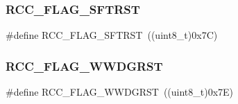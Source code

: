 \subsubsection{\texorpdfstring{RCC\_FLAG\_SFTRST}{RCC\_FLAG\_SFTRST}}
{\footnotesize\ttfamily \#define R\+C\+C\+\_\+\+F\+L\+A\+G\+\_\+\+S\+F\+T\+R\+ST~((uint8\+\_\+t)0x7\+C)}

\mbox{\label{group___r_c_c___flag_gaa80b60b2d497ccd7b7de1075009999a7}} 
\subsubsection{\texorpdfstring{RCC\_FLAG\_WWDGRST}{RCC\_FLAG\_WWDGRST}}
{\footnotesize\ttfamily \#define R\+C\+C\+\_\+\+F\+L\+A\+G\+\_\+\+W\+W\+D\+G\+R\+ST~((uint8\+\_\+t)0x7\+E)}

